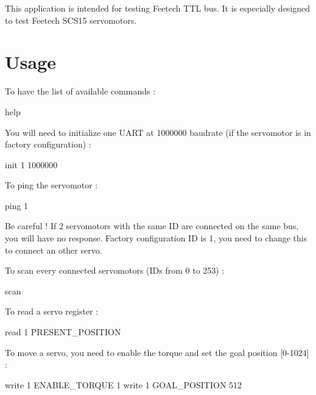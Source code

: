 This application is intended for testing Feetech T\+TL bus. It is especially designed to test Feetech S\+C\+S15 servomotors.

\section*{Usage}

To have the list of available commands \+: 
\begin{DoxyCode}
help
\end{DoxyCode}


You will need to initialize one U\+A\+RT at 1000000 baudrate (if the servomotor is in factory configuration) \+: 
\begin{DoxyCode}
init 1 1000000
\end{DoxyCode}


To ping the servomotor \+: 
\begin{DoxyCode}
ping 1
\end{DoxyCode}


Be careful ! If 2 servomotors with the same ID are connected on the same bus, you will have no response. Factory configuration ID is 1, you need to change this to connect an other servo.

To scan every connected servomotors (I\+Ds from 0 to 253) \+: 
\begin{DoxyCode}
scan
\end{DoxyCode}


To read a servo register \+: 
\begin{DoxyCode}
read 1 PRESENT\_POSITION
\end{DoxyCode}


To move a servo, you need to enable the torque and set the goal position \mbox{[}0-\/1024\mbox{]} \+: 
\begin{DoxyCode}
write 1 ENABLE\_TORQUE 1
write 1 GOAL\_POSITION 512
\end{DoxyCode}
 